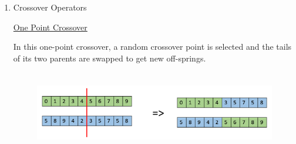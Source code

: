 \documentclass[12pt]{article}
\renewcommand{\_}{\kern-1.5pt\textunderscore\kern-1.5pt}
\begin{document}
\begin{enumerate}

\setlength{\parskip}{8.04pt}
{\fontsize{14pt}{16.8pt}\selectfont \uline{Random Selection}\par}\par

\setlength{\parskip}{7.2pt}
\begin{adjustwidth}{0.03in}{0.03in}
{\fontsize{11pt}{13.2pt}\selectfont In this strategy we randomly select parents from the existing population. There is no selection pressure towards fitter individuals and therefore this strategy is usually avoided.\par}\par

\end{adjustwidth}


\vspace{\baselineskip}
\setlength{\parskip}{8.04pt}
	\item {\fontsize{20pt}{24.0pt}\selectfont Crossover Operators\par}\par


\vspace{\baselineskip}
\setlength{\parskip}{7.2pt}
\begin{justify}
{\fontsize{14pt}{16.8pt}\selectfont \uline{One Point Crossover}\par}
\end{justify}\par

\begin{justify}
In this one-point crossover, a random crossover point is selected and the tails of its two parents are swapped to get new off-springs.
\end{justify}\par




\begin{figure}[H]
	\begin{Center}
		\includegraphics[width=6.25in,height=1.43in]{./media/image12.png}
	\end{Center}
\end{figure}



\end{enumerate}
\end{document}
